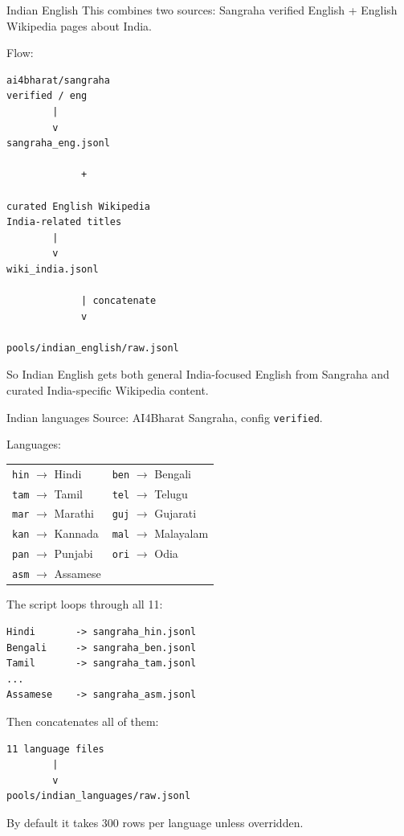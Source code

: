 \begin{paragraphblock}{Indian English}
  This combines two sources: Sangraha verified English + English Wikipedia
  pages about India.

  Flow:
\begin{lstlisting}[style=shadedpython,language={},basicstyle=\scriptsize\ttfamily]
ai4bharat/sangraha
verified / eng
        |
        v
sangraha_eng.jsonl

             +

curated English Wikipedia
India-related titles
        |
        v
wiki_india.jsonl

             | concatenate
             v

pools/indian_english/raw.jsonl
\end{lstlisting}
  So Indian English gets both general India-focused English from Sangraha
  and curated India-specific Wikipedia content.
\end{paragraphblock}

\begin{paragraphblock}{Indian languages}
  Source: AI4Bharat Sangraha, config \texttt{verified}.

  Languages:
  \begin{center}
    \renewcommand{\arraystretch}{1.15}
    \small
    \begin{tabular}{@{}ll@{}}
      \texttt{hin} $\rightarrow$ Hindi &
      \texttt{ben} $\rightarrow$ Bengali \\
      \texttt{tam} $\rightarrow$ Tamil &
      \texttt{tel} $\rightarrow$ Telugu \\
      \texttt{mar} $\rightarrow$ Marathi &
      \texttt{guj} $\rightarrow$ Gujarati \\
      \texttt{kan} $\rightarrow$ Kannada &
      \texttt{mal} $\rightarrow$ Malayalam \\
      \texttt{pan} $\rightarrow$ Punjabi &
      \texttt{ori} $\rightarrow$ Odia \\
      \texttt{asm} $\rightarrow$ Assamese &
    \end{tabular}
  \end{center}

  The script loops through all 11:
\begin{lstlisting}[style=shadedpython,language={},basicstyle=\scriptsize\ttfamily]
Hindi       -> sangraha_hin.jsonl
Bengali     -> sangraha_ben.jsonl
Tamil       -> sangraha_tam.jsonl
...
Assamese    -> sangraha_asm.jsonl
\end{lstlisting}
  Then concatenates all of them:
\begin{lstlisting}[style=shadedpython,language={},basicstyle=\scriptsize\ttfamily]
11 language files
        |
        v
pools/indian_languages/raw.jsonl
\end{lstlisting}
  By default it takes 300 rows per language unless overridden.
\end{paragraphblock}

